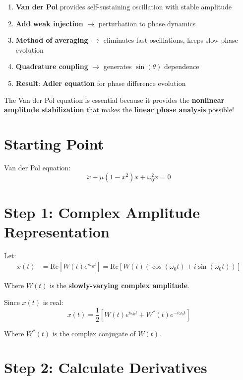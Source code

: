 \documentclass{article}
\begin{document}
\begin{enumerate}
    \item \textbf{Van der Pol} provides self-sustaining oscillation with stable amplitude
    \item \textbf{Add weak injection} $\rightarrow$ perturbation to phase dynamics
    \item \textbf{Method of averaging} $\rightarrow$ eliminates fast oscillations, keeps slow phase evolution
    \item \textbf{Quadrature coupling} $\rightarrow$ generates $\sin(\theta)$ dependence
    \item \textbf{Result}: \textbf{Adler equation} for phase difference evolution
\end{enumerate}

The Van der Pol equation is essential because it provides the \textbf{nonlinear amplitude stabilization} that makes the \textbf{linear phase analysis} possible!


\vspace{2cm}
\section{Starting Point}

Van der Pol equation:
\begin{equation}
\ddot{x} - \mu(1 - x^2)\dot{x} + \omega_0^2 x = 0
\end{equation}

\section{Step 1: Complex Amplitude Representation}

Let:
\begin{align}
x(t) &= \text{Re}[W(t)e^{i\omega_0 t}] = \text{Re}[W(t)(\cos(\omega_0 t) + i \sin(\omega_0 t))]
\end{align}

Where $W(t)$ is the \textbf{slowly-varying complex amplitude}.

Since $x(t)$ is real:
\begin{equation}
x(t) = \frac{1}{2}[W(t)e^{i\omega_0 t} + W^*(t)e^{-i\omega_0 t}]
\end{equation}

Where $W^*(t)$ is the complex conjugate of $W(t)$.

\section{Step 2: Calculate Derivatives}
\end{document}
